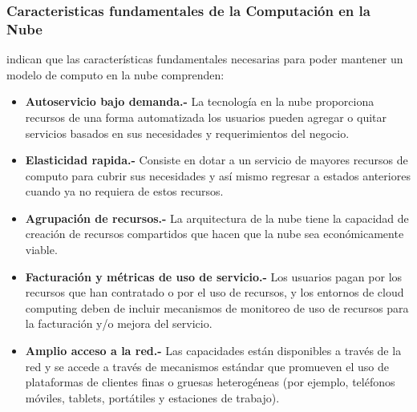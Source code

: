 \subsubsection{Caracteristicas fundamentales de la Computaci\'on en la Nube}
\cite{nist} indican que las caracter\'isticas fundamentales necesarias para poder
mantener un modelo de computo en la nube comprenden:
\begin{itemize}
    \item \textbf{Autoservicio bajo demanda.-} La tecnolog\'ia en la nube
          proporciona recursos de una forma automatizada los usuarios pueden
          agregar o quitar servicios basados en sus necesidades y requerimientos
          del negocio.
    \item \textbf{Elasticidad rapida.-} Consiste en dotar a un servicio de mayores
          recursos de computo para cubrir sus necesidades y as\'i mismo regresar
          a estados anteriores cuando ya no requiera de estos recursos.
    \item \textbf{Agrupaci\'on de recursos.-} La arquitectura de la nube tiene la capacidad
          de creaci\'on de recursos compartidos que hacen que la nube sea
          econ\'omicamente viable.
    \item \textbf{Facturaci\'on y m\'etricas de uso de servicio.-} Los usuarios
          pagan por los recursos que han contratado o por el uso de recursos, y
          los entornos de cloud computing deben de incluir mecanismos de monitoreo
          de uso de recursos para la facturaci\'on y/o mejora del servicio.
    \item \textbf{Amplio acceso a la red.-} Las capacidades est\'an disponibles
          a trav\'es de la red y se accede a trav\'es de mecanismos est\'andar
          que promueven el uso de plataformas de clientes finas o gruesas
          heterog\'eneas (por ejemplo, tel\'efonos m\'oviles, tablets, port\'atiles
          y estaciones de trabajo).
\end{itemize}
